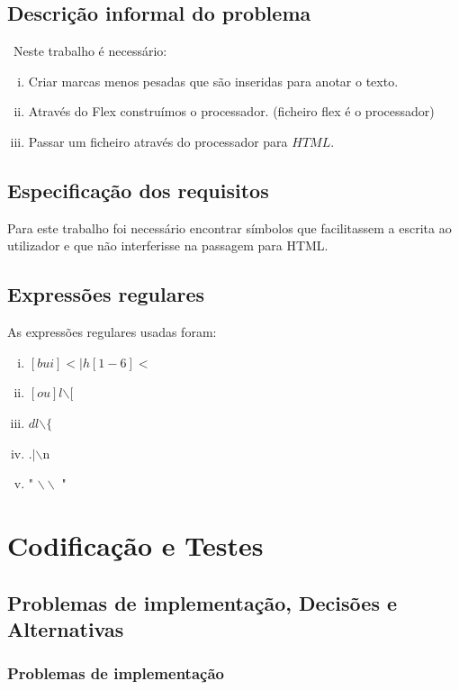 \documentclass{report}
\begin{document}
\section{Descrição informal do problema}\
Neste trabalho é necessário:
\begin{enumerate}[i)]
\item Criar marcas menos pesadas que são inseridas para anotar o texto.
\item Através do Flex construímos o processador. (ficheiro flex é o processador)
\item Passar um ficheiro através do processador para $HTML$.
\end{enumerate}

\section{Especificação dos requisitos}

Para este trabalho foi necessário encontrar símbolos que facilitassem a escrita ao utilizador e que não interferisse na passagem para HTML. 

  
\section{Expressões regulares} 

As expressões regulares usadas foram:

\begin{enumerate}[i)]
\item $ [bui]< | h[1-6]< $
\item $ [ou]l$$\backslash$$[$
\item $ dl$$\backslash$$\{$
\item $ .|$$\backslash$n
\item " $\backslash\backslash$ "

\end{enumerate}

\chapter{Codificação e Testes}
\section{Problemas de implementação, Decisões e Alternativas}
\subsection{Problemas de implementação}
\end{document}

